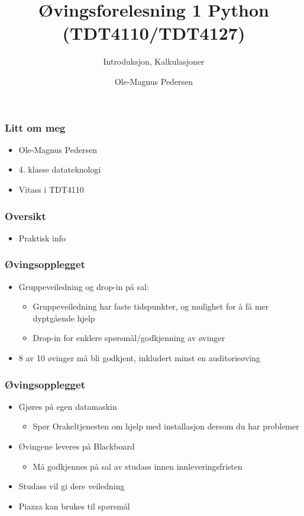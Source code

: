 \documentclass[screen, aspectratio=169]{beamer}
\title[Short title]{Øvingsforelesning 1 Python (TDT4110/TDT4127)}
\subtitle{Introduksjon, Kalkulasjoner}
\author[O.M. Pedersen]{Ole-Magnus Pedersen}
\institute[NTNU]{}
\date{}
\begin{document}
\begin{frame}
  \titlepage
\end{frame}


\begin{frame}
  \frametitle{Litt om meg}
  \begin{itemize}
  	\item Ole-Magnus Pedersen
  	\item  4. klasse datateknologi
  	\item Vitass i TDT4110
  \end{itemize}
\end{frame}

\begin{frame}
	\frametitle{Oversikt}
	\begin{itemize}
		\item Praktisk info
	\end{itemize}
\end{frame}

\begin{frame}
	\frametitle{Øvingsopplegget}
	\begin{itemize}
		\item Gruppeveiledning og drop-in på sal:
		\begin{itemize}
		    \item Gruppeveiledning har faste tidspunkter, og mulighet for å få mer dyptgående hjelp
		    \item Drop-in for enklere spørsmål/godkjenning av øvinger
		\end{itemize}
		\item 8 av 10 øvinger må bli godkjent, inkludert minst en auditorieøving
	\end{itemize}
\end{frame}

\begin{frame}
	\frametitle{Øvingsopplegget}
	\begin{itemize}
		\item Gjøres på egen datamaskin
		\begin{itemize}
			\item Spør Orakeltjenesten om hjelp med installasjon dersom du har problemer
		\end{itemize}
		\item Øvingene leveres på Blackboard
		\begin{itemize}
			\item Må godkjennes på sal av studass innen innleveringsfristen
		\end{itemize}
		\item Studass vil gi dere veiledning
		\item Piazza kan brukes til spørsmål
	\end{itemize}
\end{frame}
\end{document}
